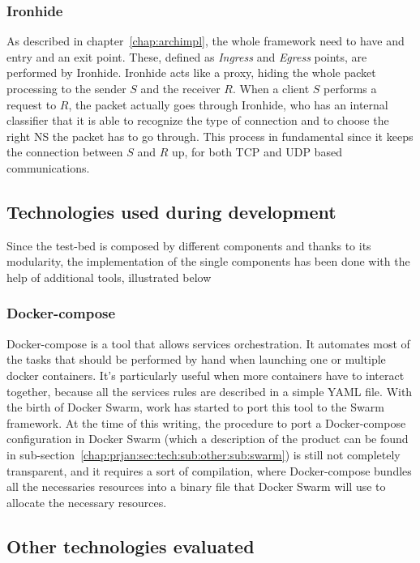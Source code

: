 \subsubsection{Ironhide}
As described in chapter~\ref{chap:archimpl}, the whole framework need to have 
and entry and an exit point. These, defined as \textit{Ingress} and 
\textit{Egress} points, are performed by Ironhide. Ironhide acts like a proxy, 
hiding the whole packet processing to the sender $S$ and the receiver $R$. When 
a client $S$ performs a request to $R$, the packet actually goes through 
Ironhide, who has an internal classifier that it is able to recognize the type 
of connection and to choose the right NS the packet has to go through. This 
process in fundamental since it keeps the connection between $S$ and $R$ up, 
for both TCP and UDP based communications.

\subsection{Technologies used during development}

Since the test-bed is composed by different components and thanks to its 
modularity, the implementation of the single components has been done with the 
help of additional tools, illustrated below

\subsubsection{Docker-compose} 
Docker-compose is a tool that allows services orchestration. It automates most 
of the tasks that should be performed by hand when launching one or multiple 
docker containers. It's particularly useful when more containers have to 
interact 
together, because all the services rules are described in a simple 
YAML file. With the birth of Docker Swarm, work has started to port this tool 
to 
the Swarm framework. At the time of this writing, the procedure to port a 
Docker-compose configuration in Docker Swarm (which a description of the 
product can be found in 
sub-section~\ref{chap:prjan:sec:tech:sub:other:sub:swarm}) is still not 
completely transparent, and it requires a sort of compilation, where 
Docker-compose bundles all the necessaries resources into a binary file that 
Docker Swarm will use to allocate the necessary resources.

\subsection{Other technologies evaluated}

